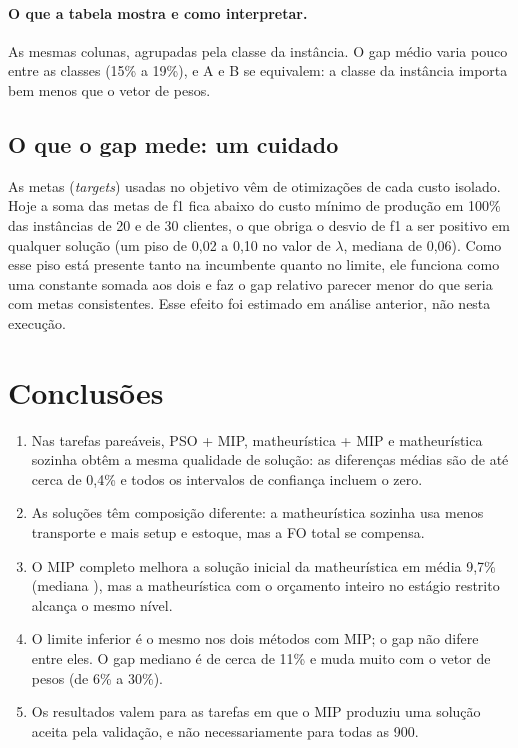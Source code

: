 \documentclass[11pt,a4paper]{article}
\begin{document}
\begin{table}[H]
  \centering
  \scriptsize
  \resizebox{\textwidth}{!}{}
  \caption{Gap por classe de instância, nas tarefas analisadas.}
  \label{tab:gap-classe}
\end{table}

\paragraph{O que a tabela mostra e como interpretar.} As mesmas colunas, agrupadas pela
classe da instância. O gap médio varia pouco entre as classes (15\% a 19\%), e A e B se
equivalem: a classe da instância importa bem menos que o vetor de pesos.

\subsection{O que o gap mede: um cuidado}

As metas (\emph{targets}) usadas no objetivo vêm de otimizações de cada custo
isolado. Hoje a soma das metas de f1 fica abaixo do custo mínimo de produção em
100\% das instâncias de 20 e de 30 clientes, o que obriga o desvio de f1 a ser positivo em
qualquer solução (um piso de 0,02 a 0,10 no valor de $\lambda$, mediana de 0,06). Como esse piso
está presente tanto na incumbente quanto no limite, ele funciona como uma constante somada
aos dois e faz o gap relativo parecer menor do que seria com metas consistentes. Esse
efeito foi estimado em análise anterior, não nesta execução.

\section{Conclusões}

\begin{enumerate}[leftmargin=*]
  \item Nas \nPaired{} tarefas pareáveis, PSO + MIP, matheurística + MIP e matheurística
  sozinha obtêm a mesma qualidade de solução: as diferenças médias são de até cerca de 0,4\% e
  todos os intervalos de confiança incluem o zero.
  \item As soluções têm composição diferente: a matheurística sozinha usa menos transporte
  e mais setup e estoque, mas a FO total se compensa.
  \item O MIP completo melhora a solução inicial da matheurística em média 9,7\% (mediana
  \gainMedian{}), mas a matheurística com o orçamento inteiro no estágio restrito alcança o mesmo
  nível.
  \item O limite inferior é o mesmo nos dois métodos com MIP; o gap não difere entre eles. O gap
  mediano é de cerca de 11\% e muda muito com o vetor de pesos (de 6\% a 30\%).
  \item Os resultados valem para as tarefas em que o MIP produziu uma solução aceita pela
  validação, e não necessariamente para todas as 900.
\end{enumerate}
\end{document}
